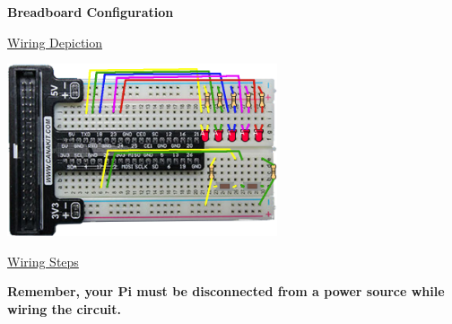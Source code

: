 \textbf{Breadboard Configuration}

\underline{Wiring Depiction}

\beforefig
\centerline{\includegraphics[height=2in]{pi_images/lab07images/PiLab07-Binary.png}}
\afterfig

\underline{Wiring Steps}

\textbf{Remember, your Pi must be disconnected from a power source while wiring the circuit.}

